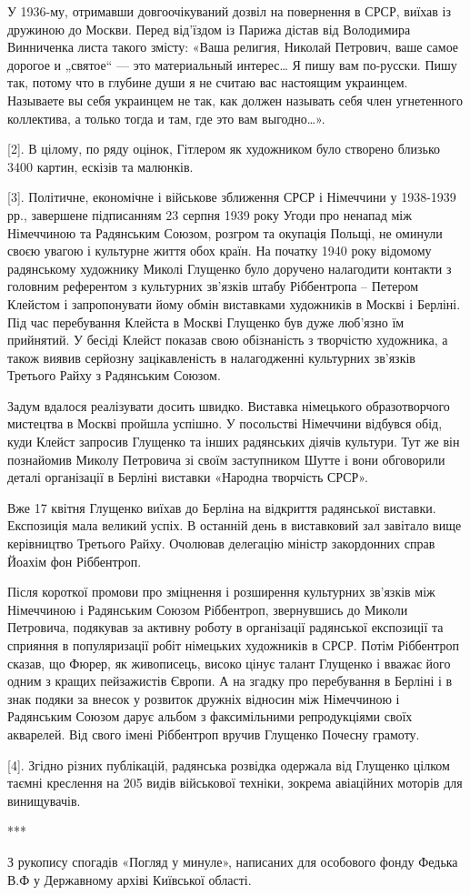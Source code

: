 У 1936-му, отримавши довгоочікуваний дозвіл на повернення в СРСР, виїхав із
дружиною до Москви. Перед від'їздом із Парижа дістав від Володимира Винниченка
листа такого змісту: «Ваша религия, Николай Петрович, ваше самое дорогое и
„святое“ — это материальный интерес… Я пишу вам по-русски. Пишу так, потому что
в глубине души я не считаю вас настоящим украинцем. Называете вы себя украинцем
не так, как должен называть себя член угнетенного коллектива, а только тогда и
там, где это вам выгодно…».  

[2]. В цілому, по ряду оцінок, Гітлером як художником було створено близько
3400 картин, ескізів та малюнків.

[3]. Політичне, економічне і військове зближення СРСР і Німеччини у 1938-1939
рр., завершене підписанням 23 серпня 1939 року Угоди про ненапад між Німеччиною
та Радянським Союзом, розгром та окупація Польщі, не оминули своєю увагою і
культурне життя обох країн. На початку 1940 року відомому радянському художнику
Миколі Глущенко було доручено налагодити контакти з головним референтом з
культурних зв'язків штабу Ріббентропа – Петером Клейстом і запропонувати йому
обмін виставками художників в Москві і Берліні. Під час перебування Клейста в
Москві Глущенко був дуже люб'язно їм прийнятий. У бесіді Клейст показав свою
обізнаність з творчістю художника, а також виявив серйозну зацікавленість в
налагодженні культурних зв'язків Третього Райху з Радянським Союзом. 

Задум вдалося реалізувати досить швидко. Виставка німецького образотворчого
мистецтва в Москві пройшла успішно. У посольстві Німеччини відбувся обід, куди
Клейст запросив Глущенко та інших радянських діячів культури. Тут же він
познайомив Миколу Петровича зі своїм заступником Шутте і вони обговорили деталі
організації в Берліні виставки «Народна творчість СРСР».

Вже 17 квітня Глущенко виїхав до Берліна на відкриття радянської виставки.
Експозиція мала великий успіх. В останній день в виставковий зал завітало вище
керівництво Третього Райху. Очолював делегацію міністр закордонних справ Йоахім
фон Ріббентроп. 

Після короткої промови про зміцнення і розширення культурних зв'язків між
Німеччиною і Радянським Союзом Ріббентроп, звернувшись до Миколи Петровича,
подякував за активну роботу в організації радянської експозиції та сприяння в
популяризації робіт німецьких художників в СРСР. Потім Ріббентроп сказав, що
Фюрер, як живописець, високо цінує талант Глущенко і вважає його одним з кращих
пейзажистів Європи. А на згадку про перебування в Берліні і в знак подяки за
внесок у розвиток дружніх відносин між Німеччиною і Радянським Союзом дарує
альбом з факсимільними репродукціями своїх акварелей. Від свого імені
Ріббентроп вручив Глущенко Почесну грамоту.

[4]. Згідно різних публікацій, радянська розвідка одержала від Глущенко цілком
таємні креслення на 205 видів військової техніки, зокрема авіаційних моторів
для винищувачів.

***

З рукопису спогадів «Погляд у минуле», написаних для особового фонду Федька В.Ф
у Державному архіві Київської області.

